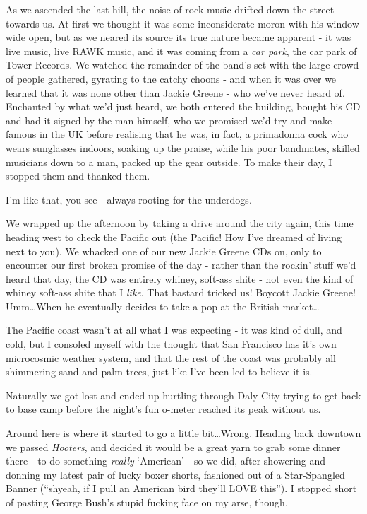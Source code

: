 \documentclass[a5paper,10pt,titlepage,draft]{book}
\begin{document}
As we ascended the last hill, the noise of rock music drifted down the street towards us.  At first we thought it was some inconsiderate moron with his window wide open, but as we neared its source its true nature became apparent - it was live music, live RAWK music, and it was coming from a \emph{car park}, the car park of Tower Records.  We watched the remainder of the band's set with the large crowd of people gathered, gyrating to the catchy choons - and when it was over we learned that it was none other than Jackie Greene - who we've never heard of.  Enchanted by what we'd just heard, we both entered the building, bought his CD and had it signed by the man himself, who we promised we'd try and make famous in the UK before realising that he was, in fact, a primadonna cock who wears sunglasses indoors, soaking up the praise, while his poor bandmates, skilled musicians down to a man, packed up the gear outside.  To make their day, I stopped them and thanked them.

I'm like that, you see - always rooting for the underdogs.

We wrapped up the afternoon by taking a drive around the city again, this time heading west to check the Pacific out (the Pacific! How I've dreamed of living next to you).  We whacked one of our new Jackie Greene CDs on, only to encounter our first broken promise of the day - rather than the rockin' stuff we'd heard that day, the CD was entirely whiney, soft-ass shite - not even the kind of whiney soft-ass shite that I \emph{like}.  That bastard tricked us!  Boycott Jackie Greene!  Umm\ldots When he eventually decides to take a pop at the British market\ldots

The Pacific coast wasn't at all what I was expecting - it was kind of dull, and cold, but I consoled myself with the thought that San Francisco has it's own microcosmic weather system, and that the rest of the coast was probably all shimmering sand and palm trees, just like I've been led to believe it is.

Naturally we got lost and ended up hurtling through Daly City trying to get back to base camp before the night's fun o-meter reached its peak without us.

Around here is where it started to go a little bit\ldots Wrong.  Heading back downtown we passed \emph{Hooters}, and decided it would be a great yarn to grab some dinner there - to do something \emph{really} `American' - so we did, after showering and donning my latest pair of lucky boxer shorts, fashioned out of a Star-Spangled Banner (``shyeah, if I pull an American bird they'll LOVE this'').  I stopped short of pasting George Bush's stupid fucking face on my arse, though.
\end{document}
